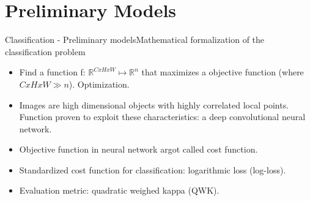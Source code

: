 \documentclass{beamer}
\begin{document}
\section{Preliminary Models}

\begin{frame}{Classification - Preliminary models}{Mathematical formalization of the classification problem}
\begin{itemize}
	\item {   
		Find a function f: $\mathbb{R}^{CxHxW} 
		\mapsto \mathbb{R}^{n}$ that maximizes a objective function (where $CxHxW \gg n$). \alert{Optimization}.
	}
	\item {
		Images are high dimensional objects with highly correlated local points.
		Function proven to exploit these characteristics: a \alert{deep convolutional neural network}.
	}
	\item {
		\alert{Objective function} in neural network argot called \alert{cost function}.
	}
	\item {
		Standardized cost function for classification: \alert{logarithmic loss} (log-loss).
	}
	\item {
		Evaluation metric: \alert{quadratic weighed kappa} (QWK).
	}
\end{itemize}
\end{frame}
\end{document}
